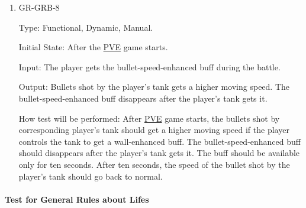 \documentclass[12pt, titlepage]{article}
\begin{document}
\begin{enumerate}
\item{GR-GRB-8\\}

Type: Functional, Dynamic, Manual.
					
Initial State: After the \underline{PVE} game starts. 
					
Input: The player gets the bullet-speed-enhanced buff during the battle.
					
Output: Bullets shot by the player's tank gets a higher moving speed. The bullet-speed-enhanced buff disappears after the player's tank gets it.
					
How test will be performed: After \underline{PVE} game starts, the bullets shot by corresponding player's tank should get a higher moving speed if the player controls the tank to get a wall-enhanced buff. The bullet-speed-enhanced buff should disappears after the player's tank gets it. The buff should be available only for ten seconds. After ten seconds, the speed of the bullet shot by the player's tank should go back to normal.

\end{enumerate}

\paragraph{Test for General Rules about Lifes}
\end{document}
